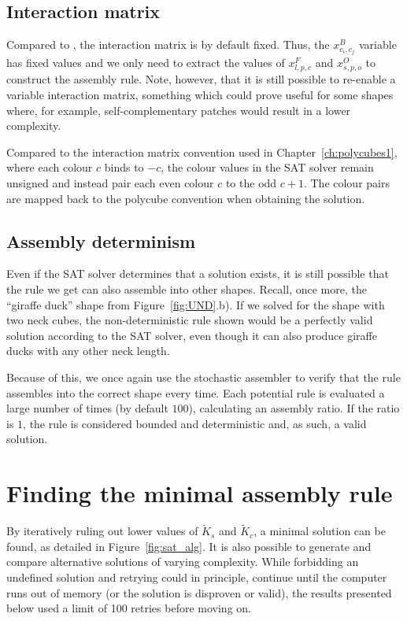 \subsection{Interaction matrix}
Compared to \cite{romano2020designing}, the interaction matrix is by default fixed. Thus, the \(x_{c_i,c_j}^{B}\) variable has fixed values and we only need to extract the values of \(x_{l,p,c}^{F}\) and \(x_{s,p,o}^{O}\) to construct the assembly rule. Note, however, that it is still possible to re-enable a variable interaction matrix, something which could prove useful for some shapes where, for example, self-complementary patches would result in a lower complexity.

Compared to the interaction matrix convention used in Chapter~\ref{ch:polycubes1}, where each colour \(c\) binds to \(-c\), the colour values in the SAT solver remain unsigned and instead pair each even colour \(c\) to the odd \(c+1\). The colour pairs are mapped back to the polycube convention when obtaining the solution.

\subsection{Assembly determinism}
Even if the SAT solver determines that a solution exists, it is still possible that the rule we get can also assemble into other shapes. Recall, once more, the ``giraffe duck'' shape from Figure~\ref{fig:UND}.b). If we solved for the shape with two neck cubes, the non-deterministic rule shown would be a perfectly valid solution according to the SAT solver, even though it can also produce giraffe ducks with any other neck length.

Because of this, we once again use the stochastic assembler to verify that the rule assembles into the correct shape every time. Each potential rule is evaluated a large number of times (by default \(100\)), calculating an assembly ratio. If the ratio is \(1\), the rule is considered bounded and deterministic and, as such, a valid solution.


\section{Finding the minimal assembly rule}

By iteratively ruling out lower values of \(\widetilde{K}_s\) and \(\widetilde{K}_c\), a minimal solution can be found, as detailed in Figure~\ref{fig:sat_alg}. It is also possible to generate and compare alternative solutions of varying complexity. While forbidding an undefined solution and retrying could in principle, continue until the computer runs out of memory (or the solution is disproven or valid), the results presented below used a limit of 100 retries before moving on.

